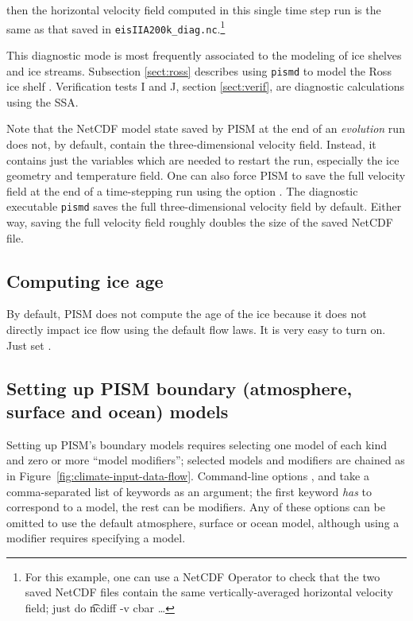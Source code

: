 \noindent then the horizontal velocity field computed in this single time step run is the same as that saved in \verb|eisIIA200k_diag.nc|.\footnote{For this example, one can use a NetCDF Operator to check that the two saved NetCDF files contain the same vertically-averaged horizontal velocity field; just do \t{ncdiff -v cbar} \dots}

This diagnostic mode is most frequently associated to the modeling of ice shelves and ice streams.  Subsection \ref{sect:ross} describes using \verb|pismd| to model the Ross ice shelf \cite{MacAyealetal}.  Verification tests I and J, section \ref{sect:verif}, are diagnostic calculations using the SSA.

Note that the NetCDF model state saved by PISM at the end of an \emph{evolution} run does not, by default, contain the three-dimensional velocity field.  Instead, it contains just the variables which are needed to restart the run, especially the ice geometry and temperature field.  One can also force PISM to save the full velocity field at the end of a time-stepping run using the option .  The diagnostic executable \verb|pismd| saves the full three-dimensional velocity field by default.  Either way, saving the full velocity field roughly doubles the size of the saved NetCDF file.



\subsection{Computing ice age} \label{subsect:age} By default, PISM does not compute the age of the ice because it does not directly impact ice flow using the default flow laws.   It is very easy to turn on.  Just set .

\subsection{Setting up PISM boundary (atmosphere, surface and ocean) models}
\label{sec:boundary-models}

Setting up PISM's boundary models requires selecting one model of each kind and zero or more ``model modifiers''; selected models and modifiers are chained as in Figure~\ref{fig:climate-input-data-flow}. Command-line options ,  and  take a comma-separated list of keywords as an argument; the first keyword \emph{has} to correspond to a model, the rest can be modifiers. Any of these options can be omitted to use the default atmosphere, surface or ocean model, although using a modifier requires specifying a model.

